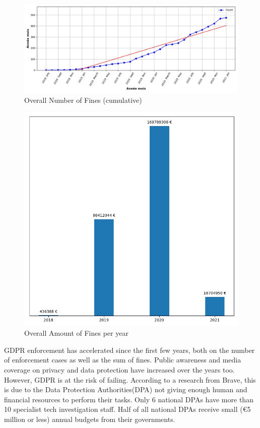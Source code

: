 \documentclass[12pt]{article}
\begin{document}
	
	\begin{figure}
		[H]\centering\includegraphics[width=0.8\linewidth]{graphs/acc_nb_cases_graph}
		\caption{Overall Number of Fines (cumulative) }
	\end{figure}
	
	\begin{multicols}{2}
	\begin{figure}
		[H]\centering\includegraphics[width=1.0\linewidth]{graphs/SumOfFinesperYear}
		\caption{Overall Amount of Fines per year }
	 \end{figure}
\justify
	GDPR enforcement has accelerated since the first few years, both on the number of enforcement cases as well as the sum of fines. Public awareness and media coverage on privacy and data protection have increased over the years too. However, GDPR is at the risk of failing. According to a research from Brave, this is due to the Data Protection Authorities(DPA) not giving enough human and financial resources to perform their tasks. Only 6 national DPAs have more than 10 specialist tech investigation staff. Half of all national DPAs receive small (€5 million or less) annual budgets from their governments.
	\end{multicols}
\end{document}
